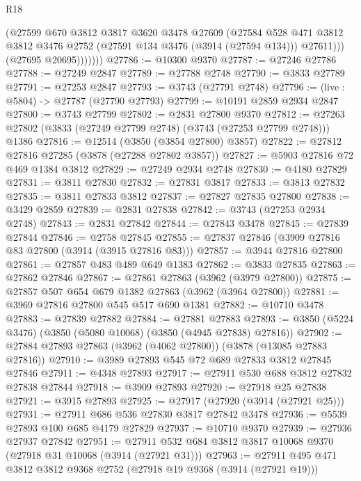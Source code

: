 \begin{lexlean}{R18}
\begin{coremodule}
                  (@27599
                    @670
                    @3812
                    @3817
                    @3620
                    @3478
                    @27609
                    (@27584
                      @528
                      @471
                      @3812
                      @3812
                      @3476
                      @2752
                      (@27591 @134 @3476 (@3914 (@27594 @134)))
                      @27611)))
                (@27695 @20695)))))))
@27786 := @10300 @9370
@27787 := @27246 @27786
@27788 := @27249 @2847
@27789 := @27788 @2748
@27790 := @3833 @27789
@27791 := @27253 @2847
@27793 := @3743 (@27791 @2748)
@27796 := (live : @5804) -> @27787 (@27790 @27793)
@27799 := @10191 @2859 @2934 @2847
@27800 := @3743 @27799
@27802 := @2831 @27800 @9370
@27812 := @27263 @27802 (@3833 (@27249 @27799 @2748) (@3743 (@27253 @27799 @2748))) @1386
@27816 := @12514 (@3850 (@3854 @27800) @3857)
@27822 := @27812 @27816 @27285 (@3878 (@27288 @27802 @3857))
@27827 := @5903 @27816 @72 @469 @1384 @3812
@27829 := @27249 @2934 @2748
@27830 := @4180 @27829
@27831 := @3811 @27830
@27832 := @27831 @3817
@27833 := @3813 @27832
@27835 := @3811 @27833 @3812
@27837 := @27827 @27835 @27800
@27838 := @3429 @2859
@27839 := @2831 @27838
@27842 := @3743 (@27253 @2934 @2748)
@27843 := @2831 @27842
@27844 := @27843 @3478
@27845 := @27839 @27844
@27846 := @2758 @27845
@27855 := @27837 @27846 (@3909 @27816 @83 @27800 (@3914 (@3915 @27816 @83)))
@27857 := @3944 @27816 @27800
@27861 := @27857 @483 @489 @649 @1383
@27862 := @3833 @27835
@27863 := @27862 @27846
@27867 := @27861 @27863 (@3962 (@3979 @27800))
@27875 := @27857 @507 @654 @679 @1382 @27863 (@3962 (@3964 @27800))
@27881 := @3969 @27816 @27800 @545 @517 @690 @1381
@27882 := @10710 @3478
@27883 := @27839 @27882
@27884 := @27881 @27883
@27893 := @3850 (@5224 @3476) (@3850 (@5080 @10068) (@3850 (@4945 @27838) @27816))
@27902 := @27884 @27893 @27863 (@3962 (@4062 @27800)) (@3878 (@13085 @27883 @27816))
@27910 := @3989 @27893 @545 @72 @689 @27833 @3812 @27845 @27846
@27911 := @4348 @27893
@27917 := @27911 @530 @688 @3812 @27832 @27838 @27844
@27918 := @3909 @27893
@27920 := @27918 @25 @27838
@27921 := @3915 @27893
@27925 := @27917 (@27920 (@3914 (@27921 @25)))
@27931 := @27911 @686 @536 @27830 @3817 @27842 @3478
@27936 := @5539 @27893 @100 @685 @4179 @27829
@27937 := @10710 @9370
@27939 := @27936 @27937 @27842
@27951 := @27911 @532 @684 @3812 @3817 @10068 @9370 (@27918 @31 @10068 (@3914 (@27921 @31)))
@27963 := @27911 @495 @471 @3812 @3812 @9368 @2752 (@27918 @19 @9368 (@3914 (@27921 @19)))

\end{coremodule}
\end{lexlean}
